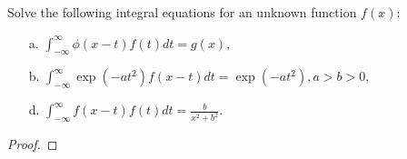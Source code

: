 \begin{problem}{2.9}
  Solve the following integral equations for an unknown function $f(x)$:
  \begin{enumerate}
    \item [a.] $\displaystyle \int_{-\infty}^{\infty} \phi(x-t) f(t) dt = g(x),$
    \item [b.] $\displaystyle \int_{-\infty}^{\infty} \exp(-at^2) f(x-t) dt = \exp(-at^2) , a > b > 0,$
    \item [d.] $\displaystyle \int_{-\infty}^{\infty} f(x-t) f(t) dt = \frac{b}{x^2 + b^2}.$
  \end{enumerate}
\end{problem}

\begin{proof}
\end{proof}
\newpage

